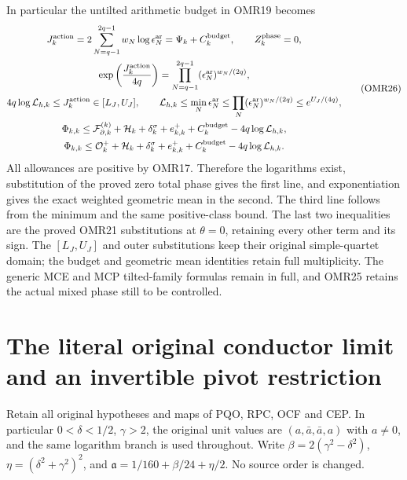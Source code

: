 \documentclass[11pt,a4paper]{article}
\begin{document}
In particular the untilted arithmetic budget in OMR19 becomes
\[
 \begin{gathered}
 J_k^{\rm action}=2\sum_{N=q-1}^{2q-1}w_N\log\epsilon_N^{\rm ar}
              =\Psi_k+C_k^{\rm budget},\qquad Z_k^{\rm phase}=0,\\
 \exp\left(\frac{J_k^{\rm action}}{4q}\right)
          =\prod_{N=q-1}^{2q-1}(\epsilon_N^{\rm ar})^{w_N/(2q)},\\
 4q\log\mathcal L_{h,k}\le J_k^{\rm action}\in[L_J,U_J],\qquad
 \mathcal L_{h,k}\le\min_N\epsilon_N^{\rm ar}
          \le\prod_N(\epsilon_N^{\rm ar})^{w_N/(2q)}
          \le e^{U_J/(4q)},\\
 \Phi_{k,k}\le
 \mathcal F_{\partial,k}^{(k)}+\mathcal H_k+\delta_k^\sigma
       +e_{k,k}^++C_k^{\rm budget}-4q\log\mathcal L_{h,k},\\
 \Phi_{k,k}\le
 \mathcal O_k^++\mathcal H_k+\delta_k^\sigma
       +e_{k,k}^++C_k^{\rm budget}-4q\log\mathcal L_{h,k}.
 \end{gathered}\tag{OMR26}
\]
All allowances are positive by OMR17. Therefore the logarithms
exist, substitution of the proved zero total phase gives the
first line, and exponentiation gives the exact weighted geometric
mean in the second. The third line follows from the minimum and
the same positive-class bound. The last two inequalities are the
proved OMR21 substitutions at $\theta=0$, retaining every other
term and its sign. The $[L_J,U_J]$ and outer substitutions keep
their original simple-quartet domain; the budget and geometric
mean identities retain full multiplicity. The generic MCE and
MCP tilted-family formulas remain in full, and OMR25 retains the
actual mixed phase still to be controlled.


\clearpage
\section{The literal original conductor limit and an invertible pivot restriction}
\label{sec:PCL}
Retain all original hypotheses and maps of PQO, RPC, OCF and CEP.
In particular $0<\delta<1/2$, $\gamma>2$, the original unit values
are $(a,\bar a,\bar a,a)$ with $a\ne0$, and the same logarithm
branch is used throughout. Write $\beta=2(\gamma^2-\delta^2)$,
$\eta=(\delta^2+\gamma^2)^2$, and
$\mathfrak a=1/160+\beta/24+\eta/2$. No source order is changed.
\end{document}
